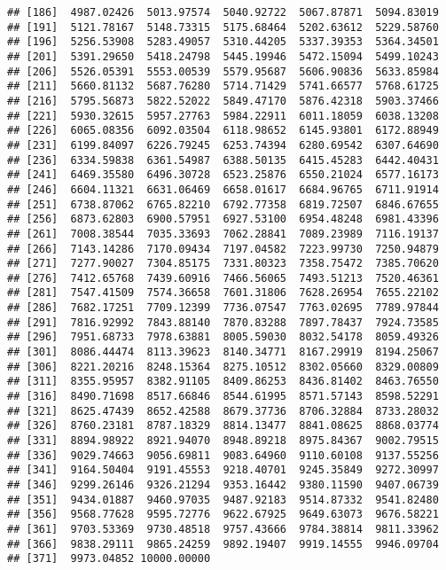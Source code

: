 \documentclass[]{article}
\begin{document}
\begin{verbatim}
## [186]  4987.02426  5013.97574  5040.92722  5067.87871  5094.83019
## [191]  5121.78167  5148.73315  5175.68464  5202.63612  5229.58760
## [196]  5256.53908  5283.49057  5310.44205  5337.39353  5364.34501
## [201]  5391.29650  5418.24798  5445.19946  5472.15094  5499.10243
## [206]  5526.05391  5553.00539  5579.95687  5606.90836  5633.85984
## [211]  5660.81132  5687.76280  5714.71429  5741.66577  5768.61725
## [216]  5795.56873  5822.52022  5849.47170  5876.42318  5903.37466
## [221]  5930.32615  5957.27763  5984.22911  6011.18059  6038.13208
## [226]  6065.08356  6092.03504  6118.98652  6145.93801  6172.88949
## [231]  6199.84097  6226.79245  6253.74394  6280.69542  6307.64690
## [236]  6334.59838  6361.54987  6388.50135  6415.45283  6442.40431
## [241]  6469.35580  6496.30728  6523.25876  6550.21024  6577.16173
## [246]  6604.11321  6631.06469  6658.01617  6684.96765  6711.91914
## [251]  6738.87062  6765.82210  6792.77358  6819.72507  6846.67655
## [256]  6873.62803  6900.57951  6927.53100  6954.48248  6981.43396
## [261]  7008.38544  7035.33693  7062.28841  7089.23989  7116.19137
## [266]  7143.14286  7170.09434  7197.04582  7223.99730  7250.94879
## [271]  7277.90027  7304.85175  7331.80323  7358.75472  7385.70620
## [276]  7412.65768  7439.60916  7466.56065  7493.51213  7520.46361
## [281]  7547.41509  7574.36658  7601.31806  7628.26954  7655.22102
## [286]  7682.17251  7709.12399  7736.07547  7763.02695  7789.97844
## [291]  7816.92992  7843.88140  7870.83288  7897.78437  7924.73585
## [296]  7951.68733  7978.63881  8005.59030  8032.54178  8059.49326
## [301]  8086.44474  8113.39623  8140.34771  8167.29919  8194.25067
## [306]  8221.20216  8248.15364  8275.10512  8302.05660  8329.00809
## [311]  8355.95957  8382.91105  8409.86253  8436.81402  8463.76550
## [316]  8490.71698  8517.66846  8544.61995  8571.57143  8598.52291
## [321]  8625.47439  8652.42588  8679.37736  8706.32884  8733.28032
## [326]  8760.23181  8787.18329  8814.13477  8841.08625  8868.03774
## [331]  8894.98922  8921.94070  8948.89218  8975.84367  9002.79515
## [336]  9029.74663  9056.69811  9083.64960  9110.60108  9137.55256
## [341]  9164.50404  9191.45553  9218.40701  9245.35849  9272.30997
## [346]  9299.26146  9326.21294  9353.16442  9380.11590  9407.06739
## [351]  9434.01887  9460.97035  9487.92183  9514.87332  9541.82480
## [356]  9568.77628  9595.72776  9622.67925  9649.63073  9676.58221
## [361]  9703.53369  9730.48518  9757.43666  9784.38814  9811.33962
## [366]  9838.29111  9865.24259  9892.19407  9919.14555  9946.09704
## [371]  9973.04852 10000.00000
\end{verbatim}
\end{document}
